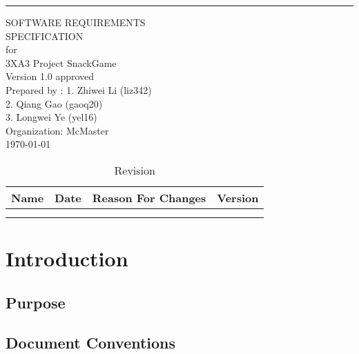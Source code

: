 \documentclass{scrreprt}
\date{}
\def\myversion{1.0 }
\begin{document}
\begin{flushright}
    \rule{16cm}{5pt}\vskip1cm
    \begin{bfseries}
        \Huge{SOFTWARE REQUIREMENTS\\ SPECIFICATION}\\
        \vspace{1.5cm}
        for\\
        \vspace{1.5cm}
        3XA3 Project SnackGame\\
        \vspace{1.5cm}
        \LARGE{Version \myversion approved}\\
        \vspace{1.5cm}
        Prepared by : 1. Zhiwei Li (liz342)\\
        2. Qiang Gao (gaoq20)\\
	3. Longwei Ye (yel16)\\
        \vspace{1.5cm}
        Organization: McMaster\\
        \vspace{1.5cm}
        \today\\
    \end{bfseries}
\end{flushright}

\tableofcontents
\begin {table}
\caption{Revision}
\begin{tabular}{|c|c|c|c|}
        \hline
        Name & Date & Reason For Changes & Version \\
        \hline
         & &  &\\
	\hline
         & & & \\
        \hline
\end{tabular}
\end {table}
\pagebreak

\chapter{Introduction} 

\section{Purpose}


\section{Document Conventions}
\end{document}
